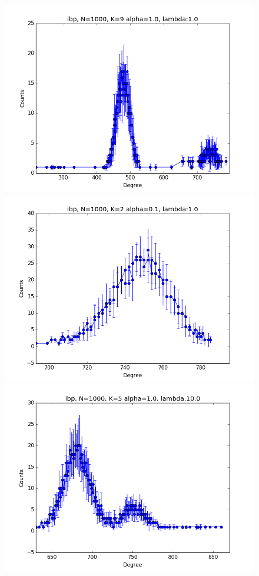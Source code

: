 \documentclass[a4paper, 12pt]{article}
\begin{document}
\begin{figure}[ht]
	\includegraphics[scale=0.27]{img/ilfm/1/figure_1}
	\endminipage
	\includegraphics[scale=0.27]{img/ilfm/2/figure_1}
	\endminipage
	\includegraphics[scale=0.27]{img/ilfm/3/figure_1}

\end{figure}
\end{document}
